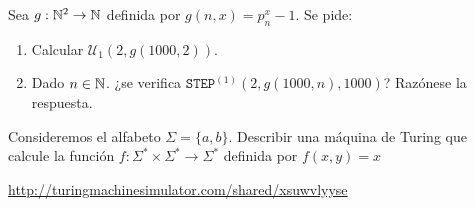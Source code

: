 \documentclass[twoside]{article}
\begin{document}
\newpage

\begin{ejercicio}{4}
Sea $g : \mathbb{N}^2 \to \mathbb{N}$ definida por $g(n, x) = p^x_n - 1$. Se pide:
\begin{enumerate}
\item Calcular $\mathcal{U}_1(2, g(1000, 2))$.
\item Dado $n \in \mathbb{N}$. ¿se verifica $\texttt{STEP}^{(1)}(2, g(1000, n), 1000)$? Razónese la respuesta.
\end{enumerate}
\end{ejercicio}
\begin{solucion}
\end{solucion}

\newpage

\begin{ejercicio}{5}
Consideremos el alfabeto $\Sigma = \{a, b\}$. Describir una máquina de
Turing que calcule la función $f : \Sigma^* \times \Sigma^* \to \Sigma^*$ definida por $f(x, y) = x$
\end{ejercicio}
\begin{solucion}
\url{http://turingmachinesimulator.com/shared/xsuwvlyyse}
\end{solucion}
\end{document}

